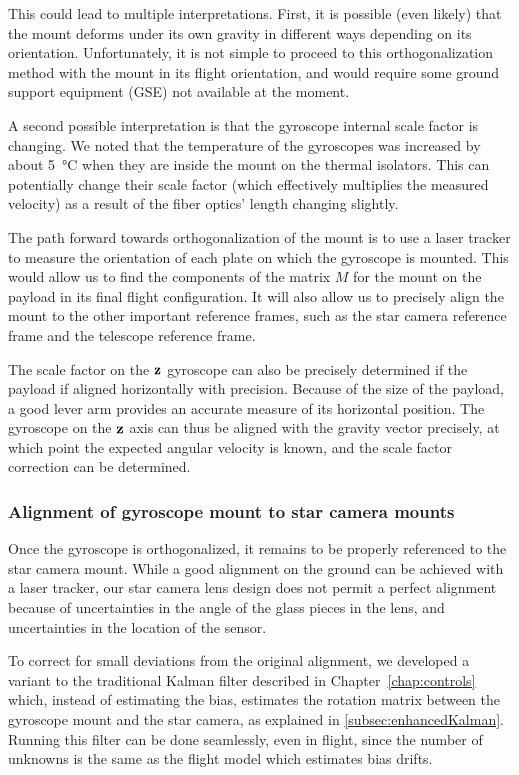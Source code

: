This could lead to multiple interpretations. First, it is possible (even likely) that the mount deforms under its own gravity in different ways depending on its orientation. Unfortunately, it is not simple to proceed to this orthogonalization method with the mount in its flight orientation, and would require some ground support equipment (GSE) not available at the moment. 

A second possible interpretation is that the gyroscope internal scale factor is changing. We noted that the temperature of the gyroscopes was increased by about \SI{5}{\degreeCelsius} when they are inside the mount on the thermal isolators. This can potentially change their scale factor (which effectively multiplies the measured velocity) as a result of the fiber optics' length changing slightly. 

The path forward towards orthogonalization of the mount is to use a laser tracker to measure the orientation of each plate on which the gyroscope is mounted. This would allow us to find the components of the matrix $M$ for the mount on the payload in its final flight configuration. It will also allow us to precisely align the mount to the other important reference frames, such as the star camera reference frame and the telescope reference frame.

The scale factor on the $\textrm{\textbf{z}}$ gyroscope can also be precisely determined if the payload if aligned horizontally with precision. Because of the size of the payload, a good lever arm provides an accurate measure of its horizontal position. The gyroscope on the $\textrm{\textbf{z}}$ axis can thus be aligned with the gravity vector precisely, at which point the expected angular velocity is known, and the scale factor correction can be determined.


\subsubsection{Alignment of gyroscope mount to star camera mounts}

Once the gyroscope is orthogonalized, it remains to be properly referenced to the star camera mount. While a good alignment on the ground can be achieved with a laser tracker, our star camera lens design does not permit a perfect alignment because of uncertainties in the angle of the glass pieces in the lens, and uncertainties in the location of the sensor. 

To correct for small deviations from the original alignment, we developed a variant to the traditional Kalman filter described in Chapter~\ref{chap:controls} which, instead of estimating the bias, estimates the rotation matrix between the gyroscope mount and the star camera, as explained in \ref{subsec:enhancedKalman}. Running this filter can be done seamlessly, even in flight, since the number of unknowns is the same as the flight model which estimates bias drifts. 







